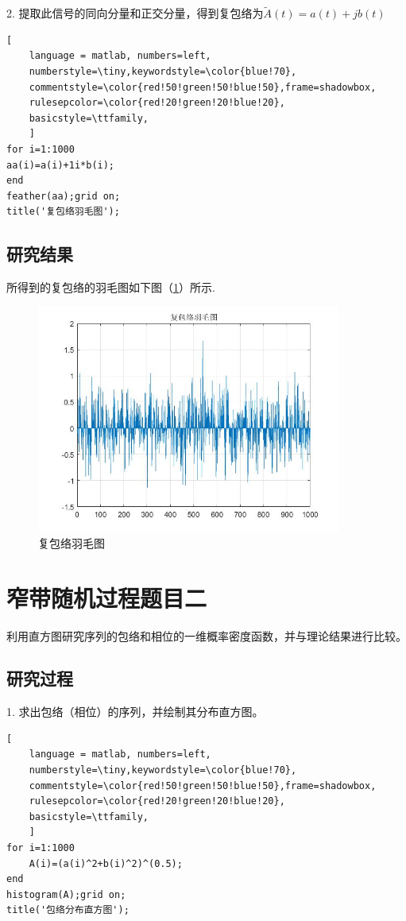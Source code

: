 \documentclass[UTF-8, a4paper, 12pt]{ctexart}
\begin{document}
2. 提取此信号的同向分量和正交分量，得到复包络为$\widetilde{A}(t)=a(t)+jb(t)$
\begin{lstlisting}[
	language = matlab, numbers=left, 
	numberstyle=\tiny,keywordstyle=\color{blue!70},
	commentstyle=\color{red!50!green!50!blue!50},frame=shadowbox,
	rulesepcolor=\color{red!20!green!20!blue!20},
	basicstyle=\ttfamily,
	]
for i=1:1000
aa(i)=a(i)+1i*b(i);
end
feather(aa);grid on;
title('复包络羽毛图');
\end{lstlisting}
\subsection{研究结果}
所得到的复包络的羽毛图如下图（\ref{f83}）所示.
\begin{figure}[htbp]
    \centering
    \includegraphics[width=10cm]{figs/f83.jpg}
    \caption{复包络羽毛图}
    \label{f83}
\end{figure}
\section{窄带随机过程题目二}
利用直方图研究序列的包络和相位的一维概率密度函数，并与理论结果进行比较。
\subsection{研究过程}
1. 求出包络（相位）的序列，并绘制其分布直方图。
\begin{lstlisting}[
	language = matlab, numbers=left, 
	numberstyle=\tiny,keywordstyle=\color{blue!70},
	commentstyle=\color{red!50!green!50!blue!50},frame=shadowbox,
	rulesepcolor=\color{red!20!green!20!blue!20},
	basicstyle=\ttfamily,
	]
for i=1:1000
    A(i)=(a(i)^2+b(i)^2)^(0.5);
end
histogram(A);grid on;
title('包络分布直方图');
\end{lstlisting}
\end{document}

